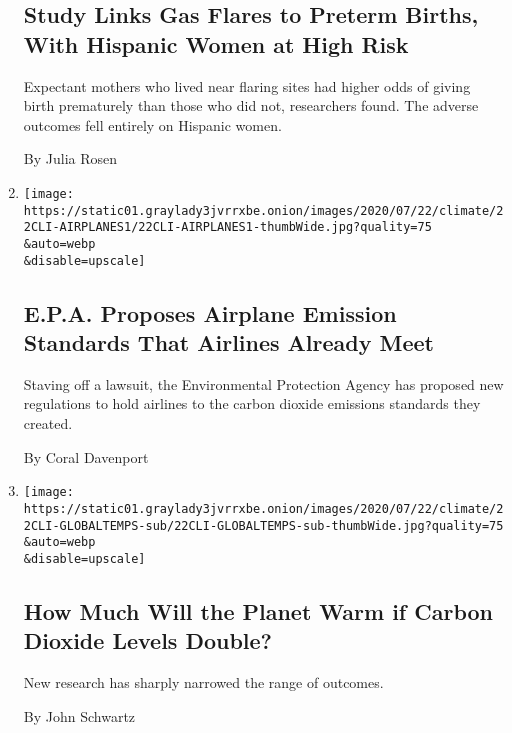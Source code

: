 \begin{enumerate}
  \hypertarget{study-links-gas-flares-to-preterm-births-with-hispanic-women-at-high-risk}{%
  \subsection{Study Links Gas Flares to Preterm Births, With Hispanic
  Women at High
  Risk}\label{study-links-gas-flares-to-preterm-births-with-hispanic-women-at-high-risk}}

  Expectant mothers who lived near flaring sites had higher odds of
  giving birth prematurely than those who did not, researchers found.
  The adverse outcomes fell entirely on Hispanic women.

  By Julia Rosen
\item
  \href{/2020/07/22/climate/airplanes-climate-change.html}{}

  \texttt{[image: https://static01.graylady3jvrrxbe.onion/images/2020/07/22/climate/22CLI-AIRPLANES1/22CLI-AIRPLANES1-thumbWide.jpg?quality=75\\\&auto=webp\\\&disable=upscale]}

  \hypertarget{epa-proposes-airplane-emission-standards-that-airlines-already-meet}{%
  \subsection{E.P.A. Proposes Airplane Emission Standards That Airlines
  Already
  Meet}\label{epa-proposes-airplane-emission-standards-that-airlines-already-meet}}

  Staving off a lawsuit, the Environmental Protection Agency has
  proposed new regulations to hold airlines to the carbon dioxide
  emissions standards they created.

  By Coral Davenport
\item
  \href{/2020/07/22/climate/global-warming-temperature-range.html}{}

  \texttt{[image: https://static01.graylady3jvrrxbe.onion/images/2020/07/22/climate/22CLI-GLOBALTEMPS-sub/22CLI-GLOBALTEMPS-sub-thumbWide.jpg?quality=75\\\&auto=webp\\\&disable=upscale]}

  \hypertarget{how-much-will-the-planet-warm-if-carbon-dioxide-levels-double}{%
  \subsection{How Much Will the Planet Warm if Carbon Dioxide Levels
  Double?}\label{how-much-will-the-planet-warm-if-carbon-dioxide-levels-double}}

  New research has sharply narrowed the range of outcomes.

  By John Schwartz
\end{enumerate}


